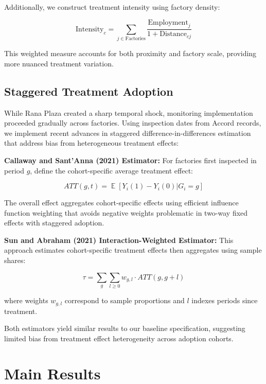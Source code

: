 \documentclass[12pt]{article}
\DeclareMathOperator{\E}{\mathbb{E}}
\begin{document}
Additionally, we construct treatment intensity using factory density:

$$\text{Intensity}_c = \sum_{j \in \text{Factories}} \frac{\text{Employment}_j}{1 + \text{Distance}_{cj}}$$

This weighted measure accounts for both proximity and factory scale, providing more nuanced treatment variation.

\subsection{Staggered Treatment Adoption}

While Rana Plaza created a sharp temporal shock, monitoring implementation proceeded gradually across factories. Using inspection dates from Accord records, we implement recent advances in staggered difference-in-differences estimation that address bias from heterogeneous treatment effects:

\textbf{Callaway and Sant'Anna (2021) Estimator:} For factories first inspected in period $g$, define the cohort-specific average treatment effect:

$$ATT(g,t) = \E[Y_i(1) - Y_i(0) | G_i = g]$$

The overall effect aggregates cohort-specific effects using efficient influence function weighting that avoids negative weights problematic in two-way fixed effects with staggered adoption.

\textbf{Sun and Abraham (2021) Interaction-Weighted Estimator:} This approach estimates cohort-specific treatment effects then aggregates using sample shares:

$$\tau = \sum_g \sum_{l \geq 0} w_{g,l} \cdot ATT(g, g+l)$$

where weights $w_{g,l}$ correspond to sample proportions and $l$ indexes periods since treatment.

Both estimators yield similar results to our baseline specification, suggesting limited bias from treatment effect heterogeneity across adoption cohorts.




\section{Main Results}
\end{document}
